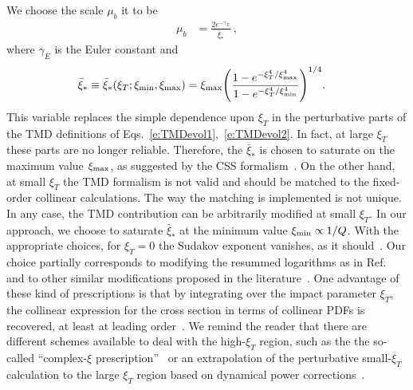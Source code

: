 \documentclass[aps,preprintnumbers,showpacs,nofootinbib,superscriptaddress,floatfix]{revtex4}
\newcommand{\bT}{\xi_T}
\newcommand{\bb}{\xi}
\begin{document}
We choose the scale $\mu_b$ it to be
\begin{align} 
\mu_b &= \frac{2 e^{-\gamma_E}}{\bar{\bb}_{\ast}} \  ,
\label{e:mub}
\end{align}  
where $\gamma_E$ is the Euler constant and
\begin{align} 
\bar{\bb}_{\ast} &\equiv \bar{\bb}_{\ast}(\bT;\bb_{\rm min},\bb_{\rm max}) = \bb_{\rm max} \Bigg(\frac{1-e^{- \bT^4 / \bb_{\rm max}^4} }{1-e^{- \bT^4 / \bb_{\rm min}^4}} \Bigg)^{1/4} .
\label{e:b*}
\end{align}  
This variable replaces the simple dependence upon $\bT$ 
in the perturbative parts of the
  TMD definitions of Eqs.~\eqref{e:TMDevol1},~\eqref{e:TMDevol2}. In fact, at
  large $\bT$ these parts are no longer reliable. Therefore, the
  $\bar{\bb}_{\ast}$ is chosen to saturate on the maximum value $\bb_{\rm max}$,
  as suggested by the CSS 
  formalism~\cite{Collins:2011zzd,Aybat:2011zv}.
On the other hand, at
small $\bT$ the TMD formalism is not valid and should be 
matched to the fixed-order collinear
calculations. The way
the matching is implemented is not unique.  In any case, the TMD contribution
can be arbitrarily modified at small $\bT$. In our approach, we choose to
saturate 
$\bar{\bb}_{\ast}$  at
the minimum value $\bb_{\rm min}\propto 1/Q$. With the appropriate choices, 
for $\bT=0$ the Sudakov exponent vanishes, as it
should~\cite{Parisi:1979se,Altarelli:1984pt}. 
Our choice partially corresponds to modifying the resummed logarithms as in
Ref.~\cite{Bozzi:2010xn} and to other similar modifications proposed in the
literature~\cite{Boer:2014tka,Collins:2016hqq}. One advantage of these kind of
prescriptions is that by integrating over the impact parameter $\bT$, the
collinear expression for the cross section in terms of collinear PDFs is
recovered, at least at leading order~\cite{Collins:2016hqq}.
We remind the reader that there are different schemes available to deal with
the high-$\bT$ region, such as the the so-called ``complex-$\bb$
prescription''~\cite{Laenen:2000de} or an extrapolation of the perturbative
small-$\bb_T$ calculation to the large $\bb_T$ region based on dynamical power
corrections~\cite{Qiu:2000hf}. 
\end{document}
